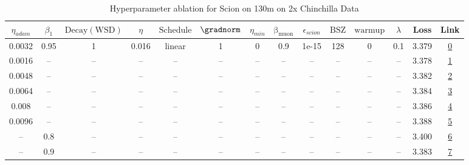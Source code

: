 \begin{table}[H]
\centering
\caption{Hyperparameter ablation for Scion on 130m on 2x Chinchilla Data}
\label{tab:ablation_scion_130m_on_2x_chinchilla_data}
\begin{tabular}{cccccccccccccc}
\toprule
$\eta_{adam}$ & $\beta_1$ & $\mathrm{Decay (WSD)}$ & $\eta$ & $\mathrm{Schedule}$ & $\gradnorm$ & $\eta_{min}$ & $\mathrm{\beta_{muon}}$ & $\epsilon_{scion}$ & $\mathrm{BSZ}$ & $\mathrm{warmup}$ & $\lambda$ & Loss & Link \\
\midrule
0.0032 & 0.95 & 1 & 0.016 & linear & 1 & 0 & 0.9 & 1e-15 & 128 & 0 & 0.1 & 3.379 & \href{https://wandb.ai/stanford-mercury/optimizer-scaling/runs/sweep-130m-5B-sciona647e8lr0.016-wd0.1-minlr0-warmup0-b10.95-gn1-9e502b}{0} \\
\midrule
0.0016 & -- & -- & -- & -- & -- & -- & -- & -- & -- & -- & -- & 3.378 & \href{https://wandb.ai/stanford-mercury/optimizer-scaling/runs/sweep-130m-5B-scion0749aelr0.016-wd0.1-minlr0-warmup0-b10.95-gn1-9268f7}{1} \\
0.0048 & -- & -- & -- & -- & -- & -- & -- & -- & -- & -- & -- & 3.382 & \href{https://wandb.ai/stanford-mercury/optimizer-scaling/runs/sweep-130m-5B-scionecb2fclr0.016-wd0.1-minlr0-warmup0-b10.95-gn1-4bd5ef}{2} \\
0.0064 & -- & -- & -- & -- & -- & -- & -- & -- & -- & -- & -- & 3.384 & \href{https://wandb.ai/stanford-mercury/optimizer-scaling/runs/sweep-130m-5B-scion11cb39lr0.016-wd0.1-minlr0-warmup0-b10.95-gn1-7d2058}{3} \\
0.008 & -- & -- & -- & -- & -- & -- & -- & -- & -- & -- & -- & 3.386 & \href{https://wandb.ai/stanford-mercury/optimizer-scaling/runs/sweep-130m-5B-scione17102lr0.016-wd0.1-minlr0-warmup0-b10.95-gn1-a96653}{4} \\
0.0096 & -- & -- & -- & -- & -- & -- & -- & -- & -- & -- & -- & 3.388 & \href{https://wandb.ai/stanford-mercury/optimizer-scaling/runs/sweep-130m-5B-scionf605fclr0.016-wd0.1-minlr0-warmup0-b10.95-gn1-ae9ebc}{5} \\
-- & 0.8 & -- & -- & -- & -- & -- & -- & -- & -- & -- & -- & 3.400 & \href{https://wandb.ai/stanford-mercury/optimizer-scaling/runs/sweep-130m-5B-scionb7ae93lr0.016-wd0.1-minlr0-warmup0-b10.8-gn1--6ad4dc}{6} \\
-- & 0.9 & -- & -- & -- & -- & -- & -- & -- & -- & -- & -- & 3.383 & \href{https://wandb.ai/stanford-mercury/optimizer-scaling/runs/sweep-130m-5B-scion6cb7fflr0.016-wd0.1-minlr0-warmup0-b10.9-gn1--4a658c}{7} \\

\end{tabular}
\end{table}
